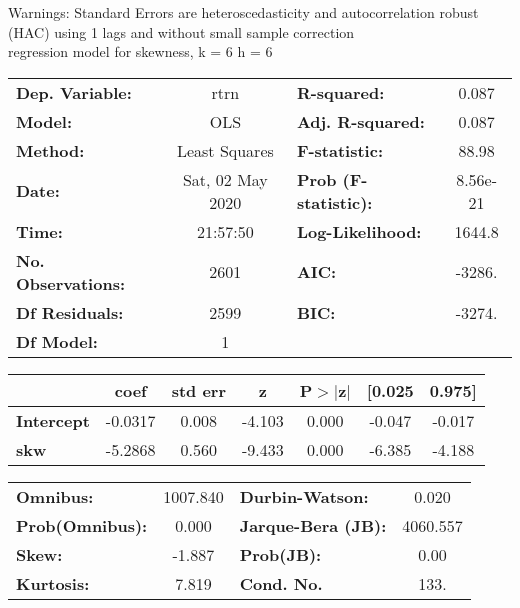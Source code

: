 Warnings: \newline
 [1] Standard Errors are heteroscedasticity and autocorrelation robust (HAC) using 1 lags and without small sample correction\\ 

regression model for skewness, k = 6 h = 6\begin{center}
\begin{tabular}{lclc}
\toprule
\textbf{Dep. Variable:}    &       rtrn       & \textbf{  R-squared:         } &     0.087   \\
\textbf{Model:}            &       OLS        & \textbf{  Adj. R-squared:    } &     0.087   \\
\textbf{Method:}           &  Least Squares   & \textbf{  F-statistic:       } &     88.98   \\
\textbf{Date:}             & Sat, 02 May 2020 & \textbf{  Prob (F-statistic):} &  8.56e-21   \\
\textbf{Time:}             &     21:57:50     & \textbf{  Log-Likelihood:    } &    1644.8   \\
\textbf{No. Observations:} &        2601      & \textbf{  AIC:               } &    -3286.   \\
\textbf{Df Residuals:}     &        2599      & \textbf{  BIC:               } &    -3274.   \\
\textbf{Df Model:}         &           1      & \textbf{                     } &             \\
\bottomrule
\end{tabular}
\begin{tabular}{lcccccc}
                   & \textbf{coef} & \textbf{std err} & \textbf{z} & \textbf{P$> |$z$|$} & \textbf{[0.025} & \textbf{0.975]}  \\
\midrule
\textbf{Intercept} &      -0.0317  &        0.008     &    -4.103  &         0.000        &       -0.047    &       -0.017     \\
\textbf{skw}       &      -5.2868  &        0.560     &    -9.433  &         0.000        &       -6.385    &       -4.188     \\
\bottomrule
\end{tabular}
\begin{tabular}{lclc}
\textbf{Omnibus:}       & 1007.840 & \textbf{  Durbin-Watson:     } &    0.020  \\
\textbf{Prob(Omnibus):} &   0.000  & \textbf{  Jarque-Bera (JB):  } & 4060.557  \\
\textbf{Skew:}          &  -1.887  & \textbf{  Prob(JB):          } &     0.00  \\
\textbf{Kurtosis:}      &   7.819  & \textbf{  Cond. No.          } &     133.  \\
\bottomrule
\end{tabular}
\end{center}

